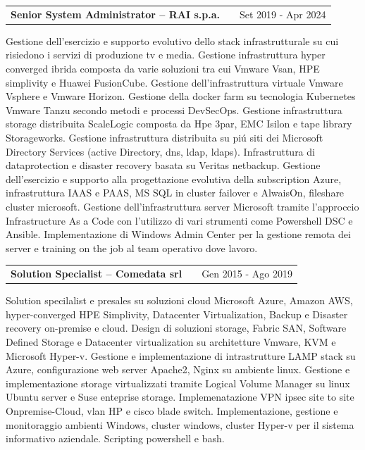 \documentclass[a4paper,12pt]{article}
\makeatletter
\newenvironment{jobshort}[2]
    {
    \begin{tabularx}{\linewidth}{@{}l X r@{}}
    \textbf{#1} & \hfill &  #2 \\[3.75pt]
    \end{tabularx}
    }
    {
    }
\makeatother
\begin{document}
\begin{jobshort}{Senior System Administrator – RAI s.p.a.}{Set 2019 - Apr 2024}
Gestione dell'esercizio e supporto evolutivo dello stack infrastrutturale su cui risiedono i servizi di produzione tv e media. Gestione infrastruttura hyper converged ibrida composta da varie soluzioni tra cui Vmware Vsan, HPE simplivity e Huawei FusionCube. Gestione dell’infrastruttura virtuale Vmware Vsphere e Vmware Horizon. Gestione della docker farm su tecnologia Kubernetes Vmware Tanzu secondo metodi e processi DevSecOps. Gestione infrastruttura storage distribuita ScaleLogic composta da Hpe 3par, EMC Isilon e tape library Storageworks.
Gestione infrastruttura distribuita su piú siti dei Microsoft Directory Services (active Directory, dns, ldap, ldaps). Infrastruttura di dataprotection e disaster recovery basata su Veritas netbackup.
Gestione dell’esercizio e supporto alla progettazione evolutiva della subscription Azure, infrastruttura IAAS e PAAS, MS SQL in cluster failover e AlwaisOn, fileshare cluster microsoft.
Gestione dell’infrastruttura server Microsoft tramite l’approccio Infrastructure As a Code con l’utilizzo di vari strumenti come Powershell DSC e Ansible.
Implementazione di Windows Admin Center per la gestione remota dei server e training on the job al team operativo dove lavoro.
\end{jobshort}

\vspace{6pt}

\begin{jobshort}{Solution Specialist – Comedata srl}{Gen 2015 - Ago 2019}
Solution specilalist e presales su soluzioni cloud Microsoft Azure, Amazon AWS, hyper-converged HPE Simplivity, Datacenter Virtualization, Backup e Disaster recovery on-premise e cloud. Design di soluzioni storage, Fabric SAN, Software Deﬁned Storage e Datacenter virtualization su architetture Vmware, KVM e Microsoft Hyper-v.
Gestione e implementazione di intrastrutture LAMP stack su Azure, conﬁgurazione web server Apache2, Nginx su ambiente linux. Gestione e implementazione storage virtualizzati tramite Logical Volume Manager su linux Ubuntu server e Suse enteprise storage. Implemenatazione VPN ipsec site to site Onpremise-Cloud, vlan HP e cisco blade switch.
Implementazione, gestione e monitoraggio ambienti Windows, cluster windows, cluster Hyper-v per il sistema informativo aziendale. Scripting powershell e bash.
\end{jobshort}

\vspace{6pt}
\end{document}
